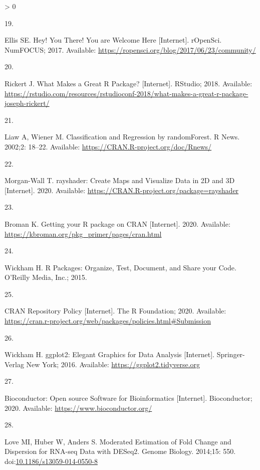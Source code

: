 \documentclass[10pt,letterpaper]{article}
\newlength{\csllabelwidth}
\newlength{\cslhangindent}
\newenvironment{CSLReferences}[3] %
 {%
  \setlength{\parindent}{0pt}
  \ifodd #1 \everypar{\setlength{\hangindent}{\cslhangindent}}\ignorespaces\fi
  \ifnum #2 > 0
  \setlength{\parskip}{#2\baselineskip}
  \fi
 }%
 {}
\newcommand{\CSLLeftMargin}[1]{\parbox[t]{\csllabelwidth}{#1}}
\newcommand{\CSLRightInline}[1]{\parbox[t]{\linewidth - \csllabelwidth}{#1}}
\begin{document}
\begin{CSLReferences}{0}{0}
\leavevmode\hypertarget{ref-ellis2017}{}%
\CSLLeftMargin{19. }
\CSLRightInline{Ellis SE. {Hey! You There! You are Welcome Here}
{[}Internet{]}. rOpenSci. NumFOCUS; 2017. Available:
\url{https://ropensci.org/blog/2017/06/23/community/}}

\leavevmode\hypertarget{ref-rickert2018}{}%
\CSLLeftMargin{20. }
\CSLRightInline{Rickert J. {What Makes a Great R Package?}
{[}Internet{]}. RStudio; 2018. Available:
\url{https://rstudio.com/resources/rstudioconf-2018/what-makes-a-great-r-package-joseph-rickert/}}

\leavevmode\hypertarget{ref-randomforest}{}%
\CSLLeftMargin{21. }
\CSLRightInline{Liaw A, Wiener M. {Classification and Regression by
randomForest}. R News. 2002;2: 18--22. Available:
\url{https://CRAN.R-project.org/doc/Rnews/}}

\leavevmode\hypertarget{ref-rayshader}{}%
\CSLLeftMargin{22. }
\CSLRightInline{Morgan-Wall T. {rayshader: Create Maps and Visualize
Data in 2D and 3D} {[}Internet{]}. 2020. Available:
\url{https://CRAN.R-project.org/package=rayshader}}

\leavevmode\hypertarget{ref-broman2020}{}%
\CSLLeftMargin{23. }
\CSLRightInline{Broman K. {Getting your R package on CRAN}
{[}Internet{]}. 2020. Available:
\url{https://kbroman.org/pkg_primer/pages/cran.html}}

\leavevmode\hypertarget{ref-wickham2015}{}%
\CSLLeftMargin{24. }
\CSLRightInline{Wickham H. {R Packages: Organize, Test, Document, and
Share your Code}. O'Reilly Media, Inc.; 2015. }

\leavevmode\hypertarget{ref-cranpolicy2020}{}%
\CSLLeftMargin{25. }
\CSLRightInline{{CRAN Repository Policy} {[}Internet{]}. The R
Foundation; 2020. Available:
\url{https://cran.r-project.org/web/packages/policies.html\#Submission}}

\leavevmode\hypertarget{ref-ggplot2}{}%
\CSLLeftMargin{26. }
\CSLRightInline{Wickham H. {ggplot2: Elegant Graphics for Data Analysis}
{[}Internet{]}. Springer-Verlag New York; 2016. Available:
\url{https://ggplot2.tidyverse.org}}

\leavevmode\hypertarget{ref-bioconductor}{}%
\CSLLeftMargin{27. }
\CSLRightInline{{Bioconductor: Open source Software for Bioinformatics}
{[}Internet{]}. Bioconductor; 2020. Available:
\url{https://www.bioconductor.org/}}

\leavevmode\hypertarget{ref-DESeq2}{}%
\CSLLeftMargin{28. }
\CSLRightInline{Love MI, Huber W, Anders S. {Moderated Estimation of
Fold Change and Dispersion for RNA-seq Data with DESeq2}. Genome
Biology. 2014;15: 550.
doi:\href{https://doi.org/10.1186/s13059-014-0550-8}{10.1186/s13059-014-0550-8}}


\end{CSLReferences}
\end{document}
